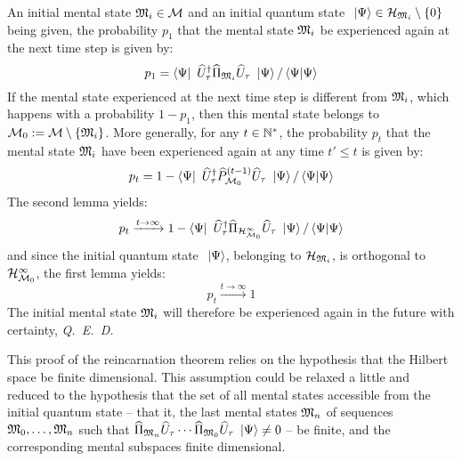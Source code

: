  An initial mental state $\mathfrak{M}_i \in \mathcal M$ and an initial quantum state $\ \left|{\Psi}\right\rangle \in \mathcal H_{\mathfrak{M}_i} \setminus \{0\}$ being given, the probability $p_1$ that the mental state $\mathfrak{M}_i$ be experienced again at the next time step is given by:
\begin{equation*}
p_1 = \left\langle{\Psi}\right|\  \widehat{U}^{\dagger}_\tau \widehat{\Pi}_{\mathfrak{M}_i} \widehat{U}_\tau \ \left|{\Psi}\right\rangle / \left\langle{\Psi}|{\Psi}\right\rangle
\end{equation*}
If the mental state experienced at the next time step is different from $\mathfrak{M}_i$, which happens with a probability $1 - p_1$, then this mental state belongs to $\mathcal M_0 := \mathcal M \setminus \{ \mathfrak{M}_i \}$. More generally, for any $t \in \mathbb{N}^*$, the probability $p_t$ that the mental state $\mathfrak{M}_i$ have been experienced again at any time $t' \leq t$ is given by:
\begin{equation*}
p_t = 1 - \left\langle{\Psi}\right|\  \widehat{U}^{\dagger}_\tau \widehat{P}_{\mathcal M_0}^{(t-1)} \widehat{U}_\tau \ \left|{\Psi}\right\rangle / \left\langle{\Psi}|{\Psi}\right\rangle
\end{equation*}
The second lemma yields:
\begin{equation*}
p_t \xrightarrow{t \to \infty} 1 - \left\langle{\Psi}\right|\  \widehat{U}^{\dagger}_\tau \widehat{\Pi}_{\mathcal H_{\mathcal M_0}^\infty} \widehat{U}_\tau \ \left|{\Psi}\right\rangle / \left\langle{\Psi}|{\Psi}\right\rangle
\end{equation*}
and since the initial quantum state $\ \left|{\Psi}\right\rangle$, belonging to $\mathcal H_{\mathfrak{M}_i}$, is orthogonal to $\mathcal H_{\mathcal M_0}^\infty$, the first lemma yields:
\begin{equation*}
p_t \xrightarrow{t \to \infty} 1
\end{equation*}
The initial mental state $\mathfrak{M}_i$ will therefore be experienced again in the future with certainty,  \textit{Q.~E.~D.}

 This proof of the reincarnation theorem relies on the hypothesis that the Hilbert space be finite dimensional. This assumption could be relaxed a little and reduced to the hypothesis that the set of all mental states accessible from the initial quantum state -- that it, the last mental states $\mathfrak{M}_n$ of sequences $\mathfrak{M}_0, \dotsc, \mathfrak{M}_n$ such that $\widehat{\Pi}_{\mathfrak{M}_n} \widehat{U}_\tau \dotsm \widehat{\Pi}_{\mathfrak{M}_0} \widehat{U}_\tau \ \left|{\Psi}\right\rangle \neq 0$ -- be finite, and the corresponding mental subspaces finite dimensional.

